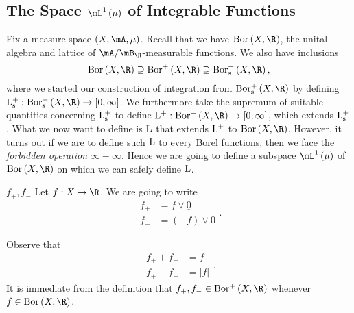 \documentclass[pmath450]{subfiles}
\begin{document}
    \subsection{The Space $\lone\left( \mu \right)$ of Integrable Functions}

    Fix a measure space $\left( X,\mA,\mu \right)$. Recall that we have $\bor\left( X,\R \right)$, the unital algebra and lattice of $\mA /\mB_{\R}$-measurable functions. We also have inclusions
    \begin{equation*}
        \bor\left( X,\R \right)\supseteq\borplus\left( X,\R \right)\supseteq\borpluss\left( X,\R \right),
    \end{equation*}
    where we started our construction of integration from $\borpluss\left( X,\R \right)$ by defining $\lpluss:\borpluss\left( X,\R \right)\to\left[ 0,\infty \right]$. We furthermore take the supremum of suitable quantities concerning $\operatorname{L^+_s}$ to define $\lplus:\borplus\left( X,\R \right)\to\left[ 0,\infty \right]$, which extends $\operatorname{L^+_s}$. What we now want to define is $\operatorname{L}$ that extends $\operatorname{L^+}$ to $\bor\left( X,\R \right)$. However, it turns out if we are to define such $\operatorname{L}$ to every Borel functions, then we face the \textit{forbidden operation} $\infty-\infty$. Hence we are going to define a subspace $\lone\left( \mu \right)$ of $\bor\left( X,\R \right)$ on which we can safely define $\operatorname{L}$.

    \begin{notation}{$f_+, f_-$}
        Let $f:X\to\R$. We are going to write
        \begin{equation*}
            \begin{aligned}
                f_+ & = f\vee\underline{0} \\
                f_- & = \left( -f \right)\vee\underline{0}
            \end{aligned} .
        \end{equation*}
    \end{notation}

    \np Observe that
    \begin{equation*}
        \begin{aligned}
            f_+ + f_- & = f \\
            f_+ - f_- & = \left| f \right|
        \end{aligned} .
    \end{equation*}
    It is immediate from the definition that $f_+,f_-\in\borplus\left( X,\R \right)$ whenever $f\in\bor\left( X,\R \right)$.
\end{document}
